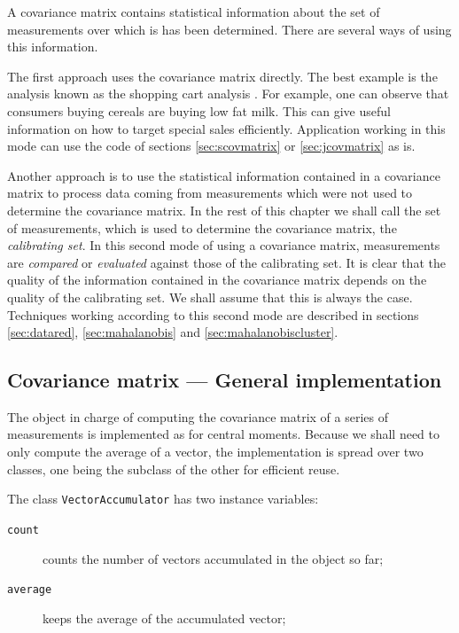 \documentclass[twoside]{book}
\begin{document}
 A covariance matrix
contains statistical information about the set of measurements
over which is has been determined. There are several ways of using
this information.

The first approach uses the covariance matrix directly. The best
example is the analysis known as the shopping cart analysis
\cite{BerLin}. For example, one can observe that consumers buying
cereals are buying low fat milk. This can give useful information
on how to target special sales efficiently. Application working in
this mode can use the code of sections \ref{sec:scovmatrix} or
\ref{sec:jcovmatrix} as is.

Another approach is to use the statistical information contained
in a covariance matrix to process data coming from measurements
which were not used to determine the covariance matrix. In the
rest of this chapter we shall call the set of measurements, which
is used to determine the covariance matrix, the {\sl calibrating
set}. In this second mode of using a covariance matrix,
measurements are {\sl compared} or {\sl evaluated} against those
of the calibrating set. It is clear that the quality of the
information contained in the covariance matrix depends on the
quality of the calibrating set. We shall assume that this is
always the case. Techniques working according to this second mode
are described in sections \ref{sec:datared}, \ref{sec:mahalanobis}
and \ref{sec:mahalanobiscluster}.

\subsection{Covariance matrix --- General implementation}
 The
object in charge of computing the covariance matrix of a series of
measurements is implemented as for central moments. Because we
shall need to only compute the average of a vector, the
implementation is spread over two classes, one being the subclass
of the other for efficient reuse.

\noindent The class {\tt VectorAccumulator} has two instance
variables: {} {\parskip 0pt
\begin{description}
  \item[\tt count] counts the number of vectors accumulated in the object so far;
  \item[\tt average] keeps the average of the accumulated vector;
\end{description}
}
\end{document}
